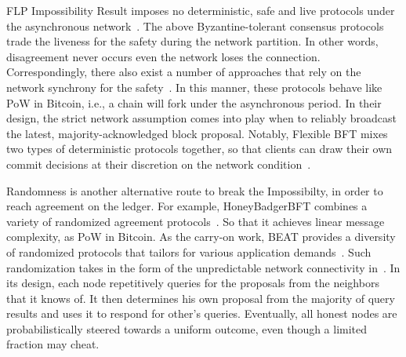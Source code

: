 FLP Impossibility Result imposes no deterministic, safe and live protocols under the asynchronous network~\cite{fischer1985impossibility}. 
The above Byzantine-tolerant consensus protocols trade the liveness for the safety during the network partition. 
In other words, disagreement never occurs even the network loses the connection. 
Correspondingly, there also exist a number of approaches that rely on the network synchrony for the safety~\cite{abraham2020sync,abraham2017efficient}. 
In this manner, these protocols behave like PoW in Bitcoin, i.e., a chain will fork under the asynchronous period. 
In their design, the strict network assumption comes into play when to reliably broadcast the latest, majority-acknowledged block proposal. 
Notably, Flexible BFT mixes two types of deterministic protocols together, so that clients can draw their own commit decisions at their discretion on the network condition~\cite{malkhi2019flexible}. 

Randomness is another alternative route to break the Impossibilty, in order to reach agreement on the ledger. 
For example, HoneyBadgerBFT combines a variety of randomized agreement protocols~\cite{miller2016honey}. 
So that it achieves linear message complexity, as PoW in Bitcoin. 
As the carry-on work, BEAT provides a diversity of randomized protocols that tailors for various application demands~\cite{duan2018beat}. 
Such randomization takes in the form of the unpredictable network connectivity in~\cite{rocket2019scalable}.
In its design, each node repetitively queries for the proposals from the neighbors that it knows of. 
It then determines his own proposal from the majority of query results and uses it to respond for other's queries. 
Eventually, all honest nodes are probabilistically steered towards a uniform outcome, even though a limited fraction may cheat. 

